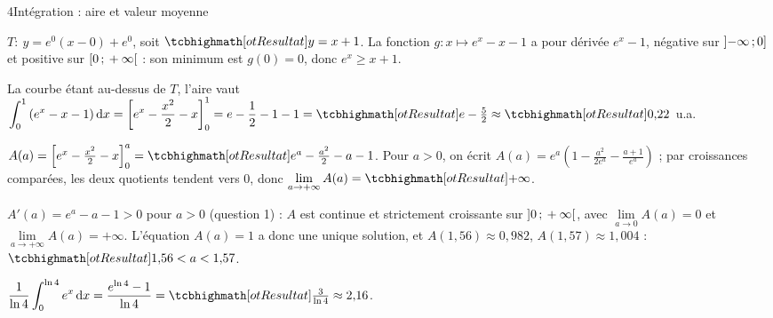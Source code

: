 \begin{corrigeBac}{4}{Intégration : aire et valeur moyenne}
\begin{questions}
  \item $T:\ y=e^{0}(x-0)+e^{0}$, soit $\res{y=x+1}$. La fonction $g:x\mapsto e^{x}-x-1$ a pour dérivée $e^{x}-1$, négative sur
    $\mathopen{]}-\infty\,{;}\,0\mathclose{]}$ et positive sur $\mathopen{[}0\,{;}\,+\infty\mathclose{[}$ : son minimum est $g(0)=0$, donc $e^{x}\geq x+1$. \pts{1 pt}
  \item La courbe étant au-dessus de $T$, l'aire vaut $\displaystyle\int_0^1\left(e^{x}-x-1\right)\mathrm{d}x
    =\left[e^{x}-\frac{x^{2}}{2}-x\right]_0^1=e-\frac12-1-1=\res{e-\tfrac52}\approx\res{0{,}22}$ u.a. 
  \item $A(a)=\left[e^{x}-\frac{x^{2}}{2}-x\right]_0^{a}=\res{e^{a}-\tfrac{a^{2}}{2}-a-1}$. Pour $a>0$, on écrit
    $A(a)=e^{a}\left(1-\frac{a^{2}}{2e^{a}}-\frac{a+1}{e^{a}}\right)$ ; par croissances comparées, les deux quotients tendent vers $0$,
    donc $\lim\limits_{a\to+\infty}A(a)=\res{+\infty}$. 
  \item $A'(a)=e^{a}-a-1>0$ pour $a>0$ (question 1) : $A$ est continue et strictement croissante sur $\mathopen{]}0\,{;}\,+\infty\mathclose{[}$, avec
    $\lim\limits_{a\to0}A(a)=0$ et $\lim\limits_{a\to+\infty}A(a)=+\infty$. L'équation $A(a)=1$ a donc une unique solution, et
    $A(1{,}56)\approx0{,}982$, $A(1{,}57)\approx1{,}004$ : $\res{1{,}56<a<1{,}57}$. \pts{1 pt}
  \item $\dfrac{1}{\ln4}\displaystyle\int_0^{\ln4}e^{x}\,\mathrm{d}x=\dfrac{e^{\ln4}-1}{\ln4}=\res{\tfrac{3}{\ln4}}\approx2{,}16$. 
\end{questions}
\end{corrigeBac}
